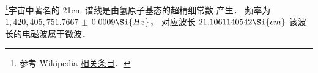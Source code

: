 
\footnote{参考 Wikipedia \href{https://en.wikipedia.org/wiki/Hydrogen_line}{相关条目}．}宇宙中著名的 21cm 谱线是由氢原子基态的超精细常数%
产生． 频率为 $1,420,405,751.7667$ $\pm$ $0.0009 \Si{Hz}$， 对应波长 $21.1061140542\Si{cm}$ 该波长的电磁波属于微波．
